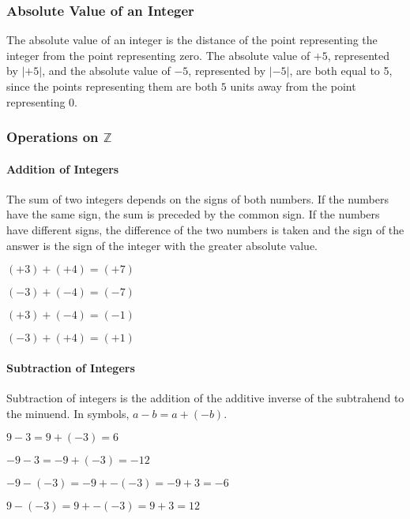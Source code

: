 \subsubsection*{Absolute Value of an Integer}
The absolute value of an integer is the distance of the point representing the integer from
the point representing zero. The absolute value of $+5$, represented by $|+5|$, and the absolute value
of $-5$, represented by $|-5|$, are both equal to 5, since the points representing them are both $5$
units away from the point representing 0.
\subsubsection*{Operations on $\mathbb Z$}
\paragraph*{Addition of Integers}
The sum of two integers depends on the signs of both numbers. If the numbers have the
same sign, the sum is preceded by the common sign. If the numbers have different signs, the
difference of the two numbers is taken and the sign of the answer is the sign of the integer with the
greater absolute value.
\begin{example}
\item 
  \begin{inparaenum}
	\item $(+3)+(+4)=(+7)$\hfil \item $(-3) + (-4) = (- 7)$
	\end{inparaenum}
\item 
	\begin{inparaenum}
	\item $(+3) + (-4) = (- 1)$\hfil \item $(-3) + (+4) = (+1)$
	\end{inparaenum}
\end{example}
\paragraph*{Subtraction of Integers}
Subtraction of integers is the addition of the additive inverse of the subtrahend to the
minuend. In symbols, $a - b = a + (-b)$.
\begin{example}
\item $9-3 = 9 + (-3) = 6$
\item $-9 - 3 = -9 + (-3) = -12$
\item $-9 - (-3) = -9 + -(-3) = -9 + 3 = -6$
\item $9 - (-3) = 9 + -(-3) = 9 + 3 = 12$
\end{example}
